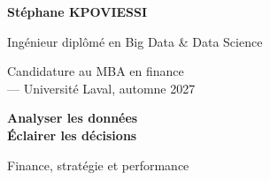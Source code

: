 \documentclass[10pt,a4paper]{article}
\begin{document}
\fontsize{10pt}{12.6pt}\selectfont
\begin{minipage}[t]{0.55\textwidth}
{\fontsize{22pt}{25pt}\selectfont\bfseries\color{accent}Stéphane KPOVIESSI}\par
Ingénieur diplômé en Big Data \& Data Science\par
{\color{muted}Candidature au MBA en finance\\--- Université Laval, automne 2027}
\end{minipage}\hfill
\begin{minipage}[t]{0.40\textwidth}
\raggedleft
{\bfseries\color{accent}Analyser les données\\Éclairer les décisions}\par
\vspace{4pt}
{\color{muted}Finance, stratégie et performance}
\end{minipage}
\vspace{7pt}
\vspace{1pt}
\vspace{8pt}
\end{document}
